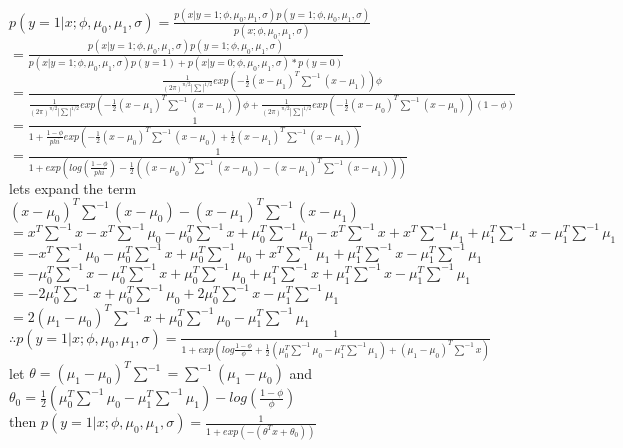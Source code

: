 \begin{answer}\\
$p(y=1|x;\phi,\mu_0,\mu_1,\sigma)=\frac{p(x|y=1;\phi,\mu_0,\mu_1,\sigma)p(y=1;\phi,\mu_0,\mu_1,\sigma)}{p(x;\phi,\mu_0,\mu_1,\sigma)}$\\
$=\frac{p(x|y=1;\phi,\mu_0,\mu_1,\sigma)p(y=1;\phi,\mu_0,\mu_1,\sigma)}{p(x|y=1;\phi,\mu_0,\mu_1,\sigma)p(y=1)+p(x|y=0;\phi,\mu_0,\mu_1,\sigma)*p(y=0)}$\\
$=\frac{\frac{1}{(2 \pi)^{n/2}| \sum | ^{1/2}} exp(-\frac{1}{2}(x-\mu_1)^T\sum^{-1}(x-\mu_1))\phi}{\frac{1}{(2 \pi)^{n/2}| \sum | ^{1/2}} exp(-\frac{1}{2}(x-\mu_1)^T\sum^{-1}(x-\mu_1))\phi+\frac{1}{(2 \pi)^{n/2}| \sum | ^{1/2}} exp(-\frac{1}{2}(x-\mu_0)^T\sum^{-1}(x-\mu_0))(1-\phi)}$\\
$=\frac{1}{1+\frac{1-\phi}{phi}exp(-\frac{1}{2}(x-\mu_0)^T\sum^{-1}(x-\mu_0)+\frac{1}{2}(x-\mu_1)^T\sum^{-1}(x-\mu_1))}$\\
$=\frac{1}{1+exp(log(\frac{1-\phi}{phi})-\frac{1}{2}((x-\mu_0)^T\sum^{-1}(x-\mu_0)-(x-\mu_1)^T\sum^{-1}(x-\mu_1)))}$\\
lets expand the term\\
$(x-\mu_0)^T\sum^{-1}(x-\mu_0)-(x-\mu_1)^T\sum^{-1}(x-\mu_1)$\\
$=x^T\sum^{-1}x-x^T\sum^{-1}\mu_0-\mu_0^T\sum^{-1}x+\mu_0^T\sum^{-1}\mu_0-x^T\sum^{-1}x+x^T\sum^{-1}\mu_1+\mu_1^T\sum^{-1}x-\mu_1^T\sum^{-1}\mu_1$\\
$=-x^T\sum^{-1}\mu_0-\mu_0^T\sum^{-1}x+\mu_0^T\sum^{-1}\mu_0+x^T\sum^{-1}\mu_1+\mu_1^T\sum^{-1}x-\mu_1^T\sum^{-1}\mu_1$\\
$=-\mu_0^T\sum^{-1}x-\mu_0^T\sum^{-1}x+\mu_0^T\sum^{-1}\mu_0+\mu_1^T\sum^{-1}x+\mu_1^T\sum^{-1}x-\mu_1^T\sum^{-1}\mu_1$\\
$=-2\mu_0^T\sum^{-1}x+\mu_0^T\sum^{-1}\mu_0+2\mu_0^T\sum^{-1}x-\mu_1^T\sum^{-1}\mu_1$\\
$=2(\mu_1-\mu_0)^T\sum^{-1}x+\mu_0^T\sum^{-1}\mu_0-\mu_1^T\sum^{-1}\mu_1$\\
$\therefore p(y=1|x;\phi,\mu_0,\mu_1,\sigma)=\frac{1}{1+exp(log\frac{1-\phi}{\phi}+\frac{1}{2}(\mu_0^T\sum^{-1}\mu_0-\mu_1^T\sum^{-1}\mu_1)+(\mu_1-\mu_0)^T\sum^{-1}x)}$\\
let $\theta=(\mu_1-\mu_0)^T\sum^{-1}=\sum^{-1}(\mu_1-\mu_0)$ and\\
$\theta_0=\frac{1}{2}(\mu_0^T\sum^{-1}\mu_0-\mu_1^T\sum^{-1}\mu_1)-log(\frac{1-\phi}{\phi})$\\
then $p(y=1|x;\phi,\mu_0,\mu_1,\sigma)=\frac{1}{1+exp(-(\theta^Tx+\theta_0))}$\\
\end{answer}
